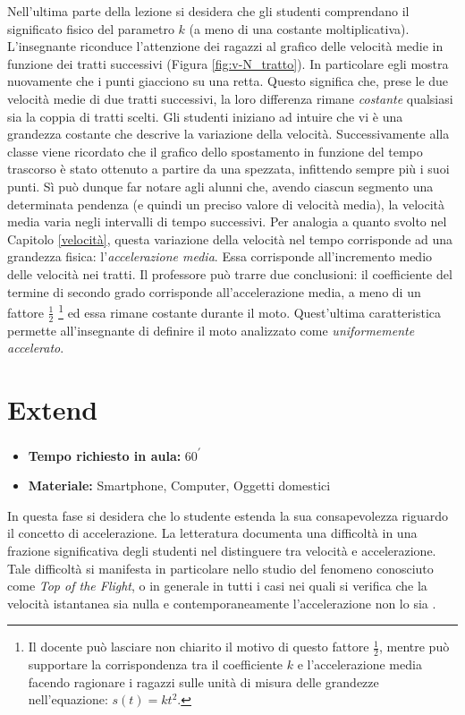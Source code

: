 \documentclass{report} \usepackage[T1]{fontenc} \usepackage[italian]{babel}
\begin{document}
Nell’ultima parte della lezione si desidera che gli studenti comprendano il
significato fisico del parametro $k$ (a meno di una costante moltiplicativa).
L’insegnante riconduce l’attenzione dei ragazzi al grafico delle
velocità medie in funzione dei tratti successivi (Figura \ref{fig:v-N_tratto}).
In particolare egli mostra nuovamente che i
punti giacciono su una retta. Questo significa che, prese le due velocità medie di
due tratti successivi, la loro differenza rimane \emph{costante} qualsiasi sia la coppia
di tratti scelti. Gli studenti iniziano ad intuire che vi è una grandezza costante che
descrive la variazione della velocità. Successivamente alla classe viene
ricordato che il grafico dello spostamento in funzione del tempo trascorso è
stato ottenuto a partire da una spezzata, infittendo sempre più i suoi punti.
Sì può dunque far notare agli alunni che, avendo ciascun segmento una determinata
pendenza (e quindi un preciso valore di velocità media), la velocità media
varia negli intervalli di tempo successivi. Per analogia a quanto svolto nel
Capitolo \ref{velocità}, questa variazione della velocità nel tempo corrisponde
ad una grandezza fisica: l’\emph{accelerazione media}. Essa corrisponde
all’incremento medio delle velocità nei tratti.
Il professore può trarre due conclusioni: il coefficiente del termine di
secondo grado corrisponde all’accelerazione media, a meno di un fattore $\frac{1}{2}$
\footnote{
          Il docente può lasciare non chiarito il motivo di questo fattore $\frac{1}{2}$,
          mentre può supportare la corrispondenza tra il coefficiente $k$ e l’accelerazione
          media facendo ragionare i ragazzi sulle unità di misura delle grandezze
          nell’equazione: $s(t) = kt^2$.
         }
ed essa rimane costante durante il moto.
Quest’ultima caratteristica permette all’insegnante di definire il moto
analizzato come \emph{uniformemente accelerato}.

\section{Extend}
\begin{itemize}
\item \textbf{Tempo richiesto in aula:} 60\textsuperscript{$\prime$}
\item \textbf{Materiale:} Smartphone, Computer, Oggetti domestici
\end{itemize}

In questa fase si desidera che lo studente estenda la sua consapevolezza
riguardo il concetto di accelerazione. La letteratura documenta una difficoltà
in una frazione significativa degli studenti nel distinguere tra velocità
e accelerazione. Tale difficoltà si manifesta in particolare nello studio
del fenomeno conosciuto come \emph{Top of the Flight}, o in generale
in tutti i casi nei quali si verifica che la velocità istantanea sia nulla
e contemporaneamente l'accelerazione non lo sia\cite{arons1997teaching}
\cite{trowbridge1981investigation}.
\end{document}
